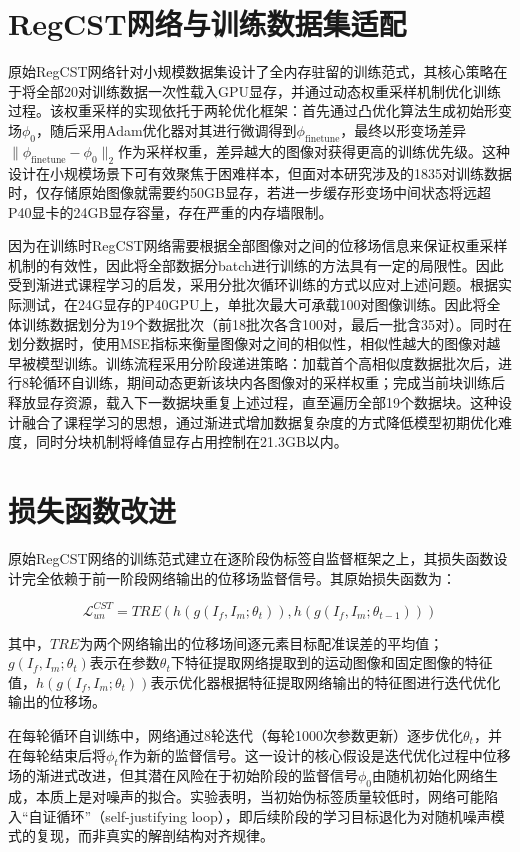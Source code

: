 \section{RegCST网络与训练数据集适配}

原始RegCST网络针对小规模数据集设计了全内存驻留的训练范式，其核心策略在于将全部20对训练数据一次性载入GPU显存，并通过动态权重采样机制优化训练过程。该权重采样的实现依托于两轮优化框架：首先通过凸优化算法生成初始形变场$\phi_0$，随后采用Adam优化器对其进行微调得到$\phi_{\text{finetune}}$，最终以形变场差异$\|\phi_{\text{finetune}} - \phi_0\|_2$作为采样权重，差异越大的图像对获得更高的训练优先级。这种设计在小规模场景下可有效聚焦于困难样本，但面对本研究涉及的1835对训练数据时，仅存储原始图像就需要约50GB显存，若进一步缓存形变场中间状态将远超P40显卡的24GB显存容量，存在严重的内存墙限制。

因为在训练时RegCST网络需要根据全部图像对之间的位移场信息来保证权重采样机制的有效性，因此将全部数据分batch进行训练的方法具有一定的局限性。因此受到渐进式课程学习的启发，采用分批次循环训练的方式以应对上述问题。根据实际测试，在24G显存的P40GPU上，单批次最大可承载100对图像训练。因此将全体训练数据划分为19个数据批次（前18批次各含100对，最后一批含35对）。同时在划分数据时，使用MSE指标来衡量图像对之间的相似性，相似性越大的图像对越早被模型训练。训练流程采用分阶段递进策略：加载首个高相似度数据批次后，进行8轮循环自训练，期间动态更新该块内各图像对的采样权重；完成当前块训练后释放显存资源，载入下一数据块重复上述过程，直至遍历全部19个数据块。这种设计融合了课程学习的思想，通过渐进式增加数据复杂度的方式降低模型初期优化难度，同时分块机制将峰值显存占用控制在21.3GB以内。


\section{损失函数改进}

原始RegCST网络的训练范式建立在逐阶段伪标签自监督框架之上，其损失函数设计完全依赖于前一阶段网络输出的位移场监督信号。其原始损失函数为：

\begin{equation}
    \mathcal{L}_{un}^{CST}=TRE(h(g(I_f,I_m;\theta_t)),h(g(I_f,I_m;\theta_{t-1})))
    \label{eq:3}
\end{equation}

其中，$TRE$为两个网络输出的位移场间逐元素目标配准误差的平均值；$g(I_f,I_m;\theta_t)$表示在参数$\theta_t$下特征提取网络提取到的运动图像和固定图像的特征值，$h(g(I_f,I_m;\theta_t))$表示优化器根据特征提取网络输出的特征图进行迭代优化输出的位移场。

在每轮循环自训练中，网络通过8轮迭代（每轮1000次参数更新）逐步优化$\theta_t$，并在每轮结束后将$\phi_t$作为新的监督信号。这一设计的核心假设是迭代优化过程中位移场的渐进式改进，但其潜在风险在于初始阶段的监督信号$\phi_0$由随机初始化网络生成，本质上是对噪声的拟合。实验表明，当初始伪标签质量较低时，网络可能陷入“自证循环”（self-justifying loop），即后续阶段的学习目标退化为对随机噪声模式的复现，而非真实的解剖结构对齐规律。

